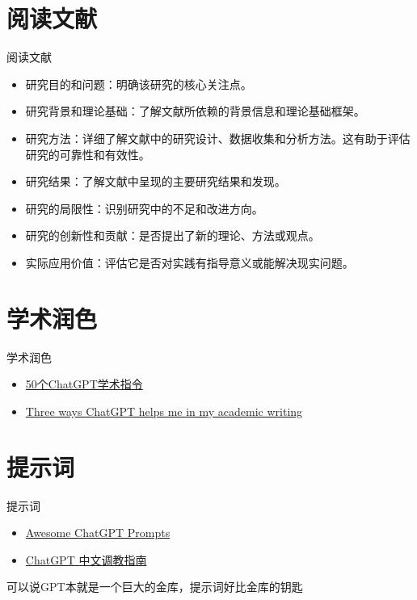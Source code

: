 \documentclass[12pt, aspectration=54, UTF8]{beamer}
\begin{document}
\section{阅读文献}
\begin{frame}{阅读文献}
\centering
\justifying
    \begin{itemize}
        \item 研究目的和问题：明确该研究的核心关注点。
        \item 研究背景和理论基础：了解文献所依赖的背景信息和理论基础框架。
        \item 研究方法：详细了解文献中的研究设计、数据收集和分析方法。这有助于评估研究的可靠性和有效性。
        \item 研究结果：了解文献中呈现的主要研究结果和发现。
        \item 研究的局限性：识别研究中的不足和改进方向。
        \item 研究的创新性和贡献：是否提出了新的理论、方法或观点。
        \item 实际应用价值：评估它是否对实践有指导意义或能解决现实问题。
    \end{itemize}
\end{frame}


\section{学术润色}
\begin{frame}{学术润色}
\centering
\justifying
    \begin{itemize}

        \item \href{https://mp.weixin.qq.com/s/WzZS1tkxhylAbT6bSjKQGw}{50个ChatGPT学术指令}
        \item  \href{https://www.nature.com/articles/d41586-024-01042-3}{Three ways ChatGPT helps me in my academic writing}
    \end{itemize}
\end{frame}


\section{提示词}
\begin{frame}{提示词}
\centering
\justifying

    \begin{itemize}
        \item \href{https://github.com/f/awesome-chatgpt-prompts}{Awesome ChatGPT Prompts}
        \item \href{https://github.com/PlexPt/awesome-chatgpt-prompts-zh}{ChatGPT 中文调教指南}
    \end{itemize}
     可以说GPT本就是一个巨大的金库，提示词好比金库的钥匙
\end{frame}
\end{document}
